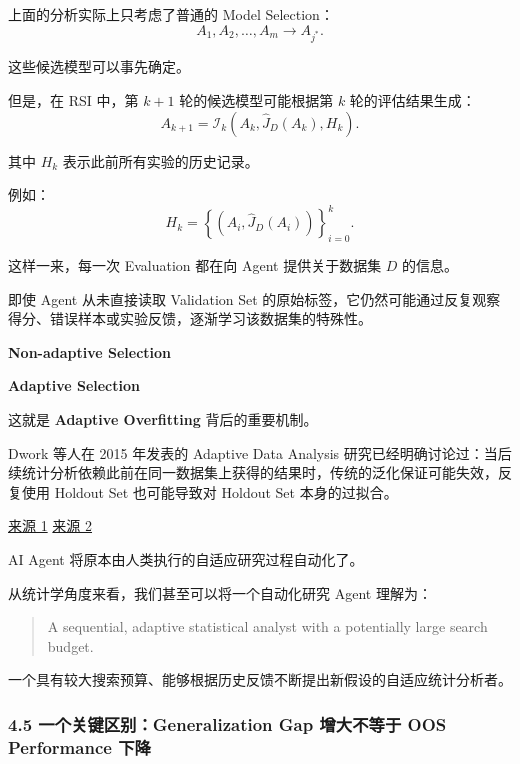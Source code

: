 上面的分析实际上只考虑了普通的 Model Selection：
\[A_1,A_2,\ldots,A_m
\longrightarrow A_{j^*}.\]

这些候选模型可以事先确定。

但是，在 RSI 中，第 \(k+1\) 轮的候选模型可能根据第 \(k\) 轮的评估结果生成：
\[A_{k+1}
=
\mathcal I_k
\left(
A_k,\widehat J_D(A_k),H_k
\right).\]

其中 \(H_k\) 表示此前所有实验的历史记录。

例如：
\[H_k=
\left\{
(A_i,\widehat J_D(A_i))
\right\}_{i=0}^{k}.\]

这样一来，每一次 Evaluation 都在向 Agent 提供关于数据集 \(D\) 的信息。

即使 Agent 从未直接读取 Validation Set 的原始标签，它仍然可能通过反复观察得分、错误样本或实验反馈，逐渐学习该数据集的特殊性。

\textbf{Non-adaptive Selection}


\textbf{Adaptive Selection}


这就是 \textbf{Adaptive Overfitting} 背后的重要机制。

Dwork 等人在 2015 年发表的 Adaptive Data Analysis 研究已经明确讨论过：当后续统计分析依赖此前在同一数据集上获得的结果时，传统的泛化保证可能失效，反复使用 Holdout Set 也可能导致对 Holdout Set 本身的过拟合。

\href{https://pubmed.ncbi.nlm.nih.gov/26250683/}{来源 1} \href{https://proceedings.neurips.cc/paper/2015/hash/bad5f33780c42f2588878a9d07405083-Abstract.html}{来源 2}

AI Agent 将原本由人类执行的自适应研究过程自动化了。

从统计学角度来看，我们甚至可以将一个自动化研究 Agent 理解为：

\begin{quote}
A sequential, adaptive statistical analyst with a potentially large search budget.
\end{quote}

一个具有较大搜索预算、能够根据历史反馈不断提出新假设的自适应统计分析者。

\hypertarget{part-1-03-0001-ux4e00ux4e2aux5173ux952eux533aux522bgeneralization-gap-ux589eux5927ux4e0dux7b49ux4e8e-oos-performance-ux4e0bux964d}{%
\subsubsection{4.5 一个关键区别：Generalization Gap 增大不等于 OOS Performance 下降}\label{part-1-03-0001-ux4e00ux4e2aux5173ux952eux533aux522bgeneralization-gap-ux589eux5927ux4e0dux7b49ux4e8e-oos-performance-ux4e0bux964d}}

